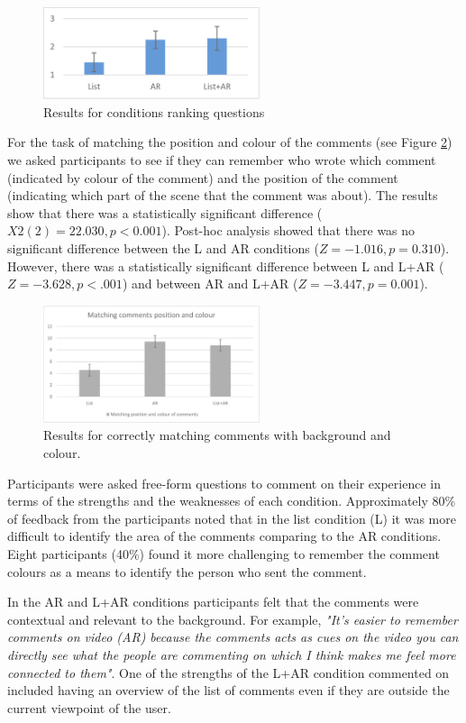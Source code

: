\begin{figure}[ht]
  \centering
  \includegraphics[width=2.5in]{images/mgia16/ranking.eps}
  \caption{Results for conditions ranking questions}
	\label{fig:mgia16:ranking}
\end{figure}

For the task of matching the position and colour of the comments (see Figure \ref{fig:mgia16:questions_matching}) we asked participants to see if they can remember who wrote which comment (indicated by colour of the comment) and the position of the comment (indicating which part of the scene that the comment was about). The results show that there was a statistically significant difference ($X2(2)=22.030, p<0.001$). Post-hoc analysis showed that there was no significant difference between the L and AR conditions ($Z=-1.016, p=0.310$). However, there was a statistically significant difference between L and L+AR ($Z=-3.628, p<.001$) and between AR and L+AR ($Z=-3.447, p=0.001$).

\begin{figure}[ht]
  \centering
  \includegraphics[width=2.5in]{images/mgia16/matching.eps}
  \caption{Results for correctly matching comments with background and colour.}
	\label{fig:mgia16:questions_matching}
\end{figure}

Participants were asked free-form questions to comment on their experience in terms of the strengths and the weaknesses of each condition. Approximately 80\% of feedback from the participants noted that in the list condition (L) it was more difficult to identify the area of the comments comparing to the AR conditions. Eight participants (40\%) found it more challenging to remember the comment colours as a means to identify the person who sent the comment. 

In the AR and L+AR conditions participants felt that the comments were contextual and relevant to the background. For example, \textit{"It's easier to remember comments on video (AR) because the comments acts as cues on the video you can directly see what the people are commenting on which I think makes me feel more connected to them"}. One of the strengths of the L+AR condition commented on included having an overview of the list of comments even if they are outside the current viewpoint of the user. 

